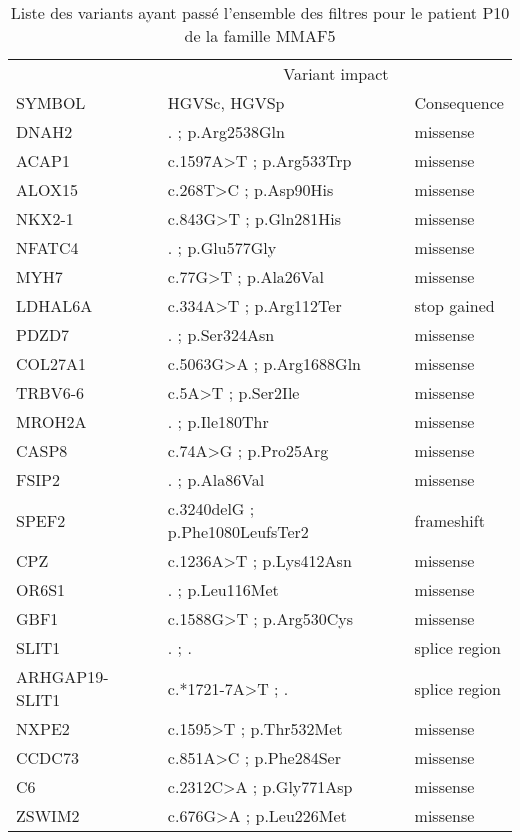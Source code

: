 \documentclass[12pt,twoside]{reedthesis}
\theoremstyle{definition}
\theoremstyle{definition}
\theoremstyle{remark}
\begin{document}
  \newpage
  
  \begin{longtable}[t]{lll}
  \caption{\label{tab:tabmmaf5}Liste des variants ayant passé l'ensemble des filtres pour le patient P10 de la famille MMAF5}\\
  \toprule
  \multicolumn{1}{c}{ } & \multicolumn{2}{c}{Variant impact} \\
  \cmidrule(l{2pt}r{2pt}){2-3}
  SYMBOL & HGVSc, HGVSp & Consequence\\
  \midrule
  DNAH2 & . ; p.Arg2538Gln & missense\\
  ACAP1 & c.1597A>T ; p.Arg533Trp & missense\\
  ALOX15 & c.268T>C ; p.Asp90His & missense\\
  NKX2-1 & c.843G>T ; p.Gln281His & missense\\
  NFATC4 & . ; p.Glu577Gly & missense\\
  \addlinespace
  MYH7 & c.77G>T ; p.Ala26Val & missense\\
  LDHAL6A & c.334A>T ; p.Arg112Ter & stop gained\\
  PDZD7 & . ; p.Ser324Asn & missense\\
  COL27A1 & c.5063G>A ; p.Arg1688Gln & missense\\
  TRBV6-6 & c.5A>T ; p.Ser2Ile & missense\\
  \addlinespace
  MROH2A & . ; p.Ile180Thr & missense\\
  CASP8 & c.74A>G ; p.Pro25Arg & missense\\
  FSIP2 & . ; p.Ala86Val & missense\\
  SPEF2 & c.3240delG ; p.Phe1080LeufsTer2 & frameshift\\
  CPZ & c.1236A>T ; p.Lys412Asn & missense\\
  \addlinespace
  OR6S1 & . ; p.Leu116Met & missense\\
  GBF1 & c.1588G>T ; p.Arg530Cys & missense\\
  SLIT1 & . ; . & splice region\\
  ARHGAP19-SLIT1 & c.*1721-7A>T ; . & splice region\\
  NXPE2 & c.1595>T ; p.Thr532Met & missense\\
  \addlinespace
  CCDC73 & c.851A>C ; p.Phe284Ser & missense\\
  C6 & c.2312C>A ; p.Gly771Asp & missense\\
  ZSWIM2 & c.676G>A ; p.Leu226Met & missense\\
  \bottomrule
  \end{longtable}
  
\end{document}
